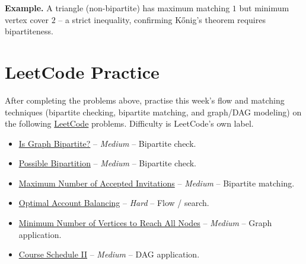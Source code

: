 \documentclass[11pt]{article}
\begin{document}
\textbf{Example.} A triangle (non-bipartite) has maximum matching $1$ but minimum vertex
cover $2$ -- a strict inequality, confirming K\H{o}nig's theorem requires bipartiteness.

\newpage
\section{LeetCode Practice}

After completing the problems above, practise this week's flow and matching techniques
(bipartite checking, bipartite matching, and graph/DAG modeling) on the following
\href{https://leetcode.com}{LeetCode} problems. Difficulty is LeetCode's own label.

\begin{itemize}
  \item \href{https://leetcode.com/problems/is-graph-bipartite/}{Is Graph Bipartite?} -- \emph{Medium} -- Bipartite check.
  \item \href{https://leetcode.com/problems/possible-bipartition/}{Possible Bipartition} -- \emph{Medium} -- Bipartite check.
  \item \href{https://leetcode.com/problems/maximum-number-of-accepted-invitations/}{Maximum Number of Accepted Invitations} -- \emph{Medium} -- Bipartite matching.
  \item \href{https://leetcode.com/problems/optimal-account-balancing/}{Optimal Account Balancing} -- \emph{Hard} -- Flow / search.
  \item \href{https://leetcode.com/problems/minimum-number-of-vertices-to-reach-all-nodes/}{Minimum Number of Vertices to Reach All Nodes} -- \emph{Medium} -- Graph application.
  \item \href{https://leetcode.com/problems/course-schedule-ii/}{Course Schedule II} -- \emph{Medium} -- DAG application.
\end{itemize}
\end{document}
